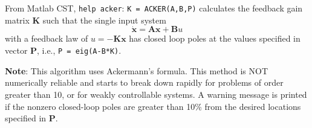 From Matlab CST, \verb|help acker|:
\verb|K = ACKER(A,B,P)|  calculates the feedback gain matrix $\mathbf{K}$ such that
the single input system
\[
\dot{\mathbf{x}}=\mathbf{Ax}+\mathbf{B}u
\]
with a feedback law of  $u = -\mathbf{Kx}$  has closed loop poles at the 
values specified in vector $\mathbf{P}$, i.e.,  \texttt{P = eig(A-B*K)}.

\textbf{Note}: This algorithm uses Ackermann's formula.  This method
is NOT numerically reliable and starts to break down rapidly
for problems of order greater than 10, or for weakly controllable
systems.  A warning message is printed if the nonzero closed-loop
poles are greater than 10\% from the desired locations specified 
in $\mathbf{P}$.


\endinput

